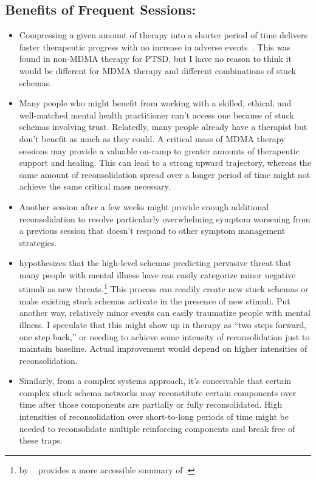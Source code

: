 \documentclass[11pt,oneside]{book}
\let\cite\parencite
\newcommand{\prosecite}[1]{\citetitle{#1} by \citefullauthor{#1}~\cite{#1}}
\begin{document}
\subsection*{Benefits of Frequent Sessions:}
\begin{itemize}
    \item Compressing a given amount of therapy into a shorter period of time delivers faster therapeutic progress with no increase in adverse events~\cite{dellMassed,ehlersMassed,foaMAssed}. This was found in non-MDMA therapy for PTSD, but I have no reason to think it would be different for MDMA therapy and different combinations of stuck schemas.
    \item Many people who might benefit from working with a skilled, ethical, and well-matched mental health practitioner can't access one because of stuck schemas involving trust. Relatedly, many people already have a therapist but don't benefit as much as they could. A critical mass of MDMA therapy sessions may provide a valuable on-ramp to greater amounts of therapeutic support and healing. This can lead to a strong upward trajectory, whereas the same amount of reconsolidation spread over a longer period of time might not achieve the same critical mass necessary.
    \item Another session after a few weeks might provide enough additional reconsolidation to resolve particularly overwhelming symptom worsening from a previous session that doesn't respond to other symptom management strategies.
    \item \textcite{berghBSTS} hypothesizes that the high-level schemas predicting pervasive threat that many people with mental illness have can easily categorize minor negative stimuli as new threats.\footnote{\prosecite{alexanderPrecision} provides a more accessible summary of \textcite{berghBSTS}.} This process can readily create new stuck schemas or make existing stuck schemas activate in the presence of new stimuli. Put another way, relatively minor events can easily traumatize people with mental illness. I speculate that this might show up in therapy as \enquote{two steps forward, one step back,} or needing to achieve some intensity of reconsolidation just to maintain baseline. Actual improvement would depend on higher intensities of reconsolidation.
    \item Similarly, from a complex systems approach, it's conceivable that certain complex stuck schema networks may reconstitute certain components over time after those components are partially or fully reconsolidated. High intensities of reconsolidation over short-to-long periods of time might be needed to reconsolidate multiple reinforcing components and break free of these traps.
\end{itemize}
\end{document}
